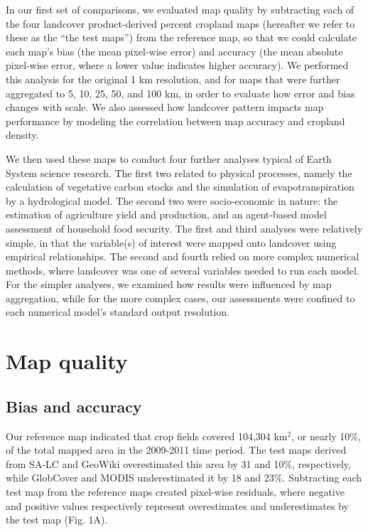 \documentclass{pnastwo}
\begin{document}
\begin{article}
In our first set of comparisons, we evaluated map quality by subtracting each of the four landcover product-derived percent cropland maps (hereafter we refer to these as the ``the test maps'') from the reference map, so that we could calculate each map's bias (the mean pixel-wise error) and accuracy (the mean absolute pixel-wise error, where a lower value indicates higher accuracy). We performed this analysis for the original 1 km resolution, and for maps that were further aggregated to 5, 10, 25, 50, and 100 km, in order to evaluate how error and bias changes with scale. We also assessed how landcover pattern impacts map performance by modeling the correlation between map accuracy and cropland density.  

We then used these maps to conduct four further analyses typical of Earth System science research. The first two related to physical processes, namely the calculation of vegetative carbon stocks and the simulation of evapotranspiration by a hydrological model. The second two were socio-economic in nature: the estimation of agriculture yield and production, and an agent-based model assessment of household food security.  The first and third analyses were relatively simple, in that the variable(s) of interest were mapped onto landcover using empirical relationships. The second and fourth relied on more complex numerical methods, where landcover was one of several variables needed to run each model. For the simpler analyses, we examined how results were influenced by map aggregation, while for the more complex cases, our assessments were confined to each numerical model's standard output resolution. 

\vspace{-0.5 cm}
\section{Map quality}
\subsection{Bias and accuracy}

Our reference map indicated that crop fields covered 104,304 km$^2$, or nearly 10\%, of the total mapped area in the 2009-2011 time period. The test maps derived from SA-LC and GeoWiki overestimated this area by 31 and 10\%, respectively, while GlobCover and MODIS underestimated it by 18 and 23\%. Subtracting each test map from the reference maps created pixel-wise residuals, where negative and positive values respectively represent overestimates and underestimates by the test map (Fig. 1A).    


\end{article}
\end{document}
